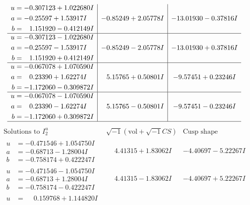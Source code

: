 \documentclass[1p]{elsarticle_modified}
\theoremstyle{definition}
\newcommand{\I}{\sqrt{-1}}
\begin{document}
$$\begin{array}{c|c|c}
\begin{aligned}
u &= -0.307123 + 1.022680 I \\
a &= -0.25597 + 1.53917 I \\
b &= \phantom{-}1.151920 - 0.412149 I\end{aligned}
 & -0.85249 + 2.05778 I & -13.01930 - 0.37816 I \\ \hline\begin{aligned}
u &= -0.307123 - 1.022680 I \\
a &= -0.25597 - 1.53917 I \\
b &= \phantom{-}1.151920 + 0.412149 I\end{aligned}
 & -0.85249 - 2.05778 I & -13.01930 + 0.37816 I \\ \hline\begin{aligned}
u &= -0.067078 + 1.070590 I \\
a &= \phantom{-}0.23390 + 1.62274 I \\
b &= -1.172060 - 0.309872 I\end{aligned}
 & \phantom{-}5.15765 + 0.50801 I & -9.57451 + 0.23246 I \\ \hline\begin{aligned}
u &= -0.067078 - 1.070590 I \\
a &= \phantom{-}0.23390 - 1.62274 I \\
b &= -1.172060 + 0.309872 I\end{aligned}
 & \phantom{-}5.15765 - 0.50801 I & -9.57451 - 0.23246 I\\
 \hline 
 \end{array}$$\newpage$$\begin{array}{c|c|c}  
\text{Solutions to }I^u_{2}& \I (\text{vol} + \sqrt{-1}CS) & \text{Cusp shape}\\
 \hline 
\begin{aligned}
u &= -0.471546 + 1.054750 I \\
a &= -0.68713 - 1.28004 I \\
b &= -0.758174 + 0.422247 I\end{aligned}
 & \phantom{-}4.41315 + 1.83062 I & -4.40697 - 5.22267 I \\ \hline\begin{aligned}
u &= -0.471546 - 1.054750 I \\
a &= -0.68713 + 1.28004 I \\
b &= -0.758174 - 0.422247 I\end{aligned}
 & \phantom{-}4.41315 - 1.83062 I & -4.40697 + 5.22267 I \\ \hline\begin{aligned}
u &= \phantom{-}0.159768 + 1.144820 I \\

\end{aligned}
\end{array}$$
\end{document}

